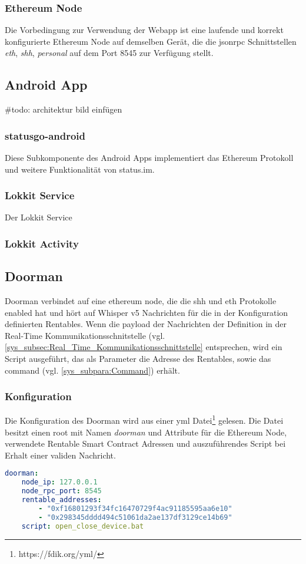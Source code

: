 \subsubsection{Ethereum Node}
Die Vorbedingung zur Verwendung der Webapp ist eine laufende und korrekt konfigurierte Ethereum Node auf demselben Gerät, die die jsonrpc Schnittstellen \emph{eth}, \emph{shh}, \emph{personal} auf dem Port 8545 zur Verfügung stellt.


\subsection{Android App}
\#todo: architektur bild einfügen

\subsubsection{statusgo-android}
Diese Subkomponente des Android Apps implementiert das Ethereum Protokoll und weitere Funktionalität von status.im.\cite{github.com/status-im/status-go}



\subsubsection{Lokkit Service}
Der Lokkit Service 

\subsubsection{Lokkit Activity}

\subsection{Doorman}
Doorman verbindet auf eine ethereum node, die die shh und eth Protokolle enabled hat und hört auf Whisper v5 Nachrichten für die in der Konfiguration definierten Rentables. Wenn die payload der Nachrichten der Definition in der Real-Time Kommunikationsschnitstelle (vgl. \ref{sys_subsec:Real_Time_Kommunikationsschnittstelle} entsprechen, wird ein Script ausgeführt, das als Parameter die Adresse des Rentables, sowie das command (vgl. \ref{sys_subpara:Command}) erhält.

\subsubsection{Konfiguration}
\label{sys_subsec:Doorman_Konfiguration}
Die Konfiguration des Doorman wird aus einer yml Datei\footnote{https://fdik.org/yml/} gelesen. Die Datei besitzt einen root mit Namen \emph{doorman} und Attribute für die Ethereum Node, verwendete Rentable Smart Contract Adressen und auszuführendes Script bei Erhalt einer validen Nachricht.
\begin{lstlisting}[language=yml,caption={Beispielkonfiguration für Doorman}]
doorman:
    node_ip: 127.0.0.1
    node_rpc_port: 8545
    rentable_addresses:
        - "0xf16801293f34fc16470729f4ac91185595aa6e10"
        - "0x298345dddd494c51061da2ae137df3129ce14b69"
    script: open_close_device.bat
\end{lstlisting}

